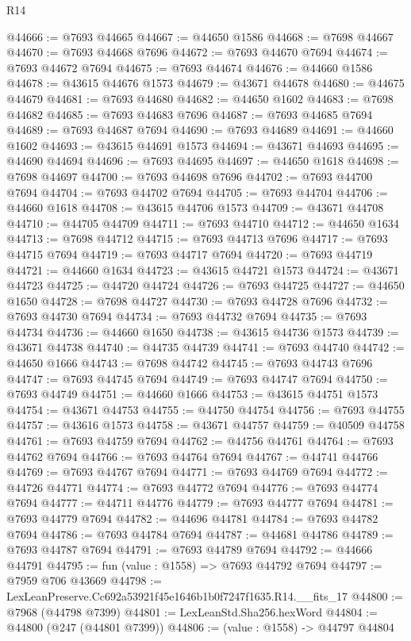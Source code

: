 \begin{lexlean}{R14}
\begin{coremodule}
@44666 := @7693 @44665
@44667 := @44650 @1586
@44668 := @7698 @44667
@44670 := @7693 @44668 @7696
@44672 := @7693 @44670 @7694
@44674 := @7693 @44672 @7694
@44675 := @7693 @44674
@44676 := @44660 @1586
@44678 := @43615 @44676 @1573
@44679 := @43671 @44678
@44680 := @44675 @44679
@44681 := @7693 @44680
@44682 := @44650 @1602
@44683 := @7698 @44682
@44685 := @7693 @44683 @7696
@44687 := @7693 @44685 @7694
@44689 := @7693 @44687 @7694
@44690 := @7693 @44689
@44691 := @44660 @1602
@44693 := @43615 @44691 @1573
@44694 := @43671 @44693
@44695 := @44690 @44694
@44696 := @7693 @44695
@44697 := @44650 @1618
@44698 := @7698 @44697
@44700 := @7693 @44698 @7696
@44702 := @7693 @44700 @7694
@44704 := @7693 @44702 @7694
@44705 := @7693 @44704
@44706 := @44660 @1618
@44708 := @43615 @44706 @1573
@44709 := @43671 @44708
@44710 := @44705 @44709
@44711 := @7693 @44710
@44712 := @44650 @1634
@44713 := @7698 @44712
@44715 := @7693 @44713 @7696
@44717 := @7693 @44715 @7694
@44719 := @7693 @44717 @7694
@44720 := @7693 @44719
@44721 := @44660 @1634
@44723 := @43615 @44721 @1573
@44724 := @43671 @44723
@44725 := @44720 @44724
@44726 := @7693 @44725
@44727 := @44650 @1650
@44728 := @7698 @44727
@44730 := @7693 @44728 @7696
@44732 := @7693 @44730 @7694
@44734 := @7693 @44732 @7694
@44735 := @7693 @44734
@44736 := @44660 @1650
@44738 := @43615 @44736 @1573
@44739 := @43671 @44738
@44740 := @44735 @44739
@44741 := @7693 @44740
@44742 := @44650 @1666
@44743 := @7698 @44742
@44745 := @7693 @44743 @7696
@44747 := @7693 @44745 @7694
@44749 := @7693 @44747 @7694
@44750 := @7693 @44749
@44751 := @44660 @1666
@44753 := @43615 @44751 @1573
@44754 := @43671 @44753
@44755 := @44750 @44754
@44756 := @7693 @44755
@44757 := @43616 @1573
@44758 := @43671 @44757
@44759 := @40509 @44758
@44761 := @7693 @44759 @7694
@44762 := @44756 @44761
@44764 := @7693 @44762 @7694
@44766 := @7693 @44764 @7694
@44767 := @44741 @44766
@44769 := @7693 @44767 @7694
@44771 := @7693 @44769 @7694
@44772 := @44726 @44771
@44774 := @7693 @44772 @7694
@44776 := @7693 @44774 @7694
@44777 := @44711 @44776
@44779 := @7693 @44777 @7694
@44781 := @7693 @44779 @7694
@44782 := @44696 @44781
@44784 := @7693 @44782 @7694
@44786 := @7693 @44784 @7694
@44787 := @44681 @44786
@44789 := @7693 @44787 @7694
@44791 := @7693 @44789 @7694
@44792 := @44666 @44791
@44795 := fun (value : @1558) => @7693 @44792 @7694
@44797 := @7959 @706 @43669
@44798 := LexLeanPreserve.Cc692a53921f45e1646b1b0f7247f1635.R14.__fits_17
@44800 := @7968 (@44798 @7399)
@44801 := LexLeanStd.Sha256.hexWord
@44804 := @44800 (@247 (@44801 @7399))
@44806 := (value : @1558) -> @44797 @44804

\end{coremodule}
\end{lexlean}
